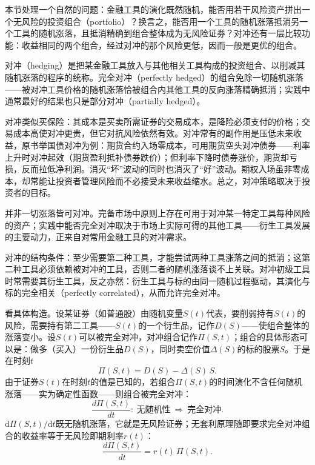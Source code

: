 本节处理一个自然的问题：金融工具的演化既然随机，能否用若干风险资产拼出一个无风险的投资组合（portfolio）？换言之，能否用一个工具的随机涨落抵消另一个工具的随机涨落，且抵消精确到组合整体成为无风险证券？对冲还有一层比较功能：收益相同的两个组合，经过对冲的那个风险更低，因而一般是更优的组合。

对冲（hedging）是把某金融工具放入与其他相关工具构成的投资组合、以削减其随机涨落的程序的统称。完全对冲（perfectly hedged）的组合免除一切随机涨落——被对冲工具价格的随机涨落恰被组合内其他工具的反向涨落精确抵消；实践中通常最好的结果也只是部分对冲（partially hedged）。

对冲类似买保险：其成本是买卖所需证券的交易成本，是降险必须支付的价格；交易成本高使对冲更贵，但它对抗风险依然有效。对冲常有的副作用是压低未来收益，原书举国债对冲为例：期货合约入场零成本，可用期货空头对冲债券——利率上升时对冲起效（期货盈利抵补债券跌价）；但利率下降时债券涨价，期货却亏损，反而拉低净利润。消灭“坏”波动的同时也消灭了“好”波动。期权入场虽非零成本，却常能让投资者管理风险而不必接受未来收益缩水。总之，对冲策略取决于投资者的目标。

并非一切涨落皆可对冲。完备市场中原则上存在可用于对冲某一特定工具每种风险的资产；实践中能否完全对冲取决于市场上实际可得的其他工具——衍生工具发展的主要动力，正来自对常用金融工具的对冲需求。

对冲的结构条件：至少需要第二种工具，才能尝试两种工具涨落之间的抵消；这第二种工具必须依赖被对冲的工具，否则二者的随机涨落谈不上关联。对冲初级工具时常需要其衍生工具，反之亦然：衍生工具与标的由同一随机过程驱动，其演化与标的完全相关（perfectly correlated），从而允许完全对冲。

看具体构造。设某证券（如普通股）由随机变量$S(t)$代表，要削弱持有$S(t)$的风险，需要持有第二工具——$S(t)$的一个衍生品，记作$D(S)$——使组合整体的涨落变小。设$S(t)$可以被完全对冲，对冲组合记作$\Pi(S,t)$；组合的具体形态可以是：做多（买入）一份衍生品$D(S)$，同时卖空价值$\Delta(S)$的标的股票$S$。于是在时刻$t$
\begin{equation*}
\Pi(S,t)=D(S)-\Delta(S)\,S .
\end{equation*}
由于证券$S(t)$在时刻$t$的值是已知的，若组合$\Pi(S,t)$的时间演化不含任何随机涨落——实为确定性函数——则组合被完全对冲：
\begin{equation*}
\frac{d\Pi(S,t)}{dt}:\ \text{无随机性}\ \Longrightarrow\ \text{完全对冲}.
\end{equation*}
$\mathrm{d}\Pi(S,t)/\mathrm{d}t$既无随机涨落，它就是无风险证券；无套利原理随即要求完全对冲组合的收益率等于无风险即期利率$r(t)$：
\begin{equation*}
\frac{d\Pi(S,t)}{dt}=r(t)\,\Pi(S,t).
\end{equation*}

